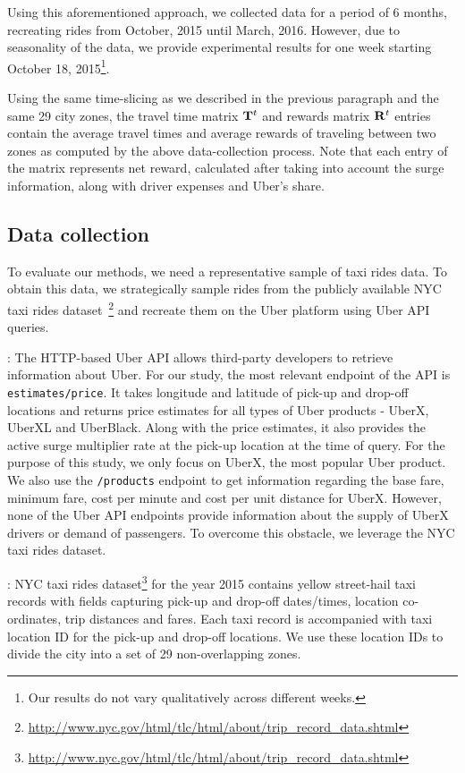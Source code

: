 Using this aforementioned approach, we collected data for a period of 6 months, recreating rides from October, 2015 until March, 2016. However, due to seasonality of the data, we provide experimental results for one week starting October 18, 2015\footnote{Our results do not vary qualitatively across different weeks.}.


Using the same time-slicing as we described in the previous paragraph and the same
29 city zones, the
travel time matrix ${\mathbf{T}}^t$ and rewards matrix ${\mathbf{R}}^t$ entries contain the average travel times and average rewards of traveling between two zones
as computed by the above data-collection process. Note that each entry of the {\rewardsmatrix} matrix represents net reward, calculated after taking into account the surge information, along with driver expenses and Uber's share. %


\iffalse
\subsection{Data collection}
\label{sec:data}
To evaluate our methods, we need a representative sample of taxi rides data. To obtain this data, we strategically sample rides from the publicly available NYC taxi rides 
dataset~\footnote{\url{http://www.nyc.gov/html/tlc/html/about/trip_record_data.shtml}} and recreate them on the Uber platform using Uber API queries.

: 
The HTTP-based Uber API allows third-party developers to retrieve information about Uber. For our study, the most relevant endpoint of the API is \texttt{estimates/price}. It takes longitude and latitude of pick-up and drop-off locations and returns price estimates for all types of Uber products - UberX, UberXL and UberBlack. Along with the price estimates, it also provides the active surge multiplier rate at the pick-up location at the time of query. For the purpose of this study, we only focus on UberX, the most popular Uber product. We also use the \texttt{/products} endpoint to get information regarding the base fare, minimum fare, cost per minute and cost per unit distance for UberX. However, none of the Uber API endpoints provide information about the supply of UberX drivers or demand of passengers. To overcome this obstacle, we leverage the NYC taxi rides dataset.

:
NYC taxi rides dataset\footnote{\url{http://www.nyc.gov/html/tlc/html/about/trip_record_data.shtml}} for the year 2015 contains yellow street-hail taxi records with fields capturing pick-up and drop-off dates/times, location co-ordinates, trip distances and fares. Each taxi record is accompanied with taxi location ID for the pick-up and drop-off locations. We use these location IDs to divide the city into a set of 29 non-overlapping zones.

